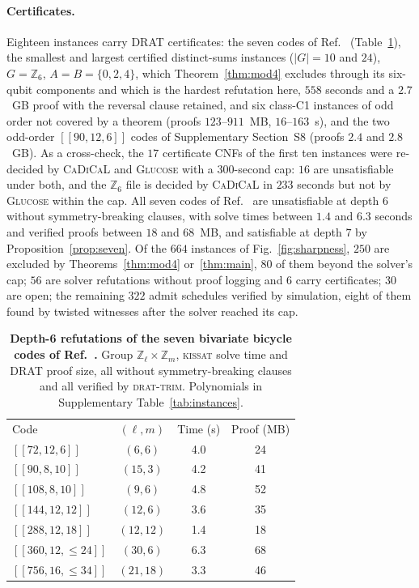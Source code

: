 \documentclass[reprint,twocolumn,superscriptaddress,nofootinbib]{revtex4-2}
\theoremstyle{plain}
\begin{document}
\paragraph*{Certificates.}
Eighteen instances carry DRAT certificates: the seven codes of
Ref.~\cite{Bravyi2024} (Table~\ref{tab:certificates}), the smallest and
largest certified distinct-sums instances ($|G|=10$ and $24$),
$G=\mathbb{Z}_6$, $A=B=\{0,2,4\}$, which Theorem~\ref{thm:mod4} excludes
through its six-qubit components and which is the hardest refutation here,
$558$ seconds and a $2.7$~GB proof with the reversal clause retained, and
six class-C1 instances of odd order not covered by a theorem (proofs
$123$--$911$~MB, $16$--$163$~s), and the two odd-order $[[90,12,6]]$ codes
of Supplementary Section~S8 (proofs $2.4$ and $2.8$~GB). As a cross-check, the $17$ certificate
CNFs of the first ten instances were re-decided by \textsc{CaDiCaL} and
\textsc{Glucose} with a $300$-second cap: $16$ are unsatisfiable under
both, and the $\mathbb{Z}_6$ file is decided by \textsc{CaDiCaL} in $233$
seconds but not by \textsc{Glucose} within the cap. All seven codes of
Ref.~\cite{Bravyi2024} are unsatisfiable at depth $6$ without
symmetry-breaking clauses, with solve times between $1.4$ and $6.3$
seconds and verified proofs between $18$ and $68$~MB, and satisfiable at
depth $7$ by Proposition~\ref{prop:seven}. Of the $664$ instances of
Fig.~\ref{fig:sharpness}, $250$ are excluded by Theorems~\ref{thm:mod4}
or~\ref{thm:main}, $80$ of them beyond the solver's cap; $56$ are solver
refutations without proof logging and $6$ carry certificates; $30$ are
open; the remaining $322$ admit schedules verified by simulation, eight of
them found by twisted witnesses after the solver reached its cap.

\begin{table}[t]
\caption{\textbf{Depth-6 refutations of the seven bivariate bicycle codes
of Ref.~\cite{Bravyi2024}.} Group $\mathbb{Z}_\ell\times\mathbb{Z}_m$,
\textsc{kissat} solve time and DRAT proof size, all without
symmetry-breaking clauses and all verified by \textsc{drat-trim}.
Polynomials in Supplementary Table~\ref{tab:instances}.}
\label{tab:certificates}
\begin{ruledtabular}
\begin{tabular}{lccc}
Code & $(\ell,m)$ & Time (s) & Proof (MB) \\
\colrule
$[[72,12,6]]$      & $(6,6)$   & 4.0 & 24 \\
$[[90,8,10]]$      & $(15,3)$  & 4.2 & 41 \\
$[[108,8,10]]$     & $(9,6)$   & 4.8 & 52 \\
$[[144,12,12]]$    & $(12,6)$  & 3.6 & 35 \\
$[[288,12,18]]$    & $(12,12)$ & 1.4 & 18 \\
$[[360,12,\le24]]$ & $(30,6)$  & 6.3 & 68 \\
$[[756,16,\le34]]$ & $(21,18)$ & 3.3 & 46 \\
\end{tabular}
\end{ruledtabular}
\end{table}
\end{document}
